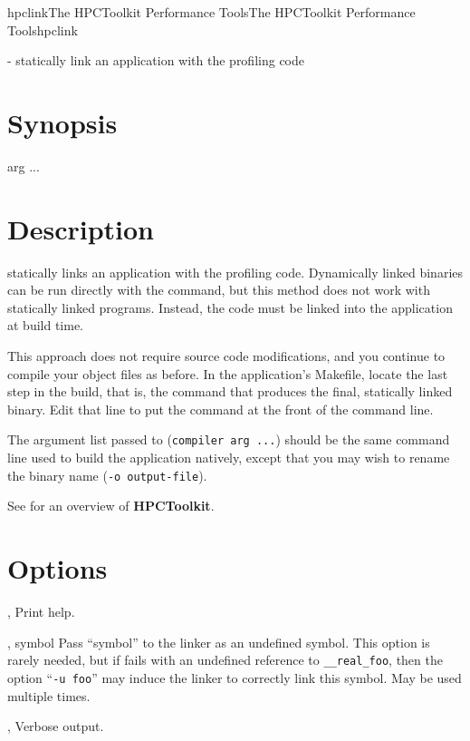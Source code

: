 \documentclass[english]{article}
\begin{document}
\begin{Name}{1}{hpclink}{The HPCToolkit Performance Tools}{The HPCToolkit Performance Tools}{hpclink}

 - statically link an application with the 
profiling code

\end{Name}

\section{Synopsis}

   arg ...

\section{Description}

 statically links an application with the 
profiling code.  Dynamically linked binaries can be run directly with
the  command, but this method does not work with
statically linked programs.  Instead, the  code must be
linked into the application at build time.

This approach does not require source code modifications, and you
continue to compile your object files as before.  In the application's
Makefile, locate the last step in the build, that is, the command that
produces the final, statically linked binary.  Edit that line to put
the  command at the front of the command line.

The argument list passed to  (\texttt{compiler arg ...})
should be the same command line used to build the application
natively, except that you may wish to rename the binary name
(\texttt{-o output-file}).

See  for an overview of
\textbf{HPCToolkit}.

\section{Options}

\begin{Description}
\item[\Opt{-h}, \Opt{--help}]
Print help.
%
\item[\Opt{-u}, \Opt{--undefined} symbol]
Pass ``symbol'' to the linker as an undefined symbol.  This option is
rarely needed, but if  fails with an undefined reference
to \texttt{\_\_real\_foo}, then the option ``\texttt{-u foo}'' may
induce the linker to correctly link this symbol.  May be used multiple
times.
%
\item[\Opt{-v}, \Opt{--verbose}]
Verbose output.
\end{Description}
\end{document}
